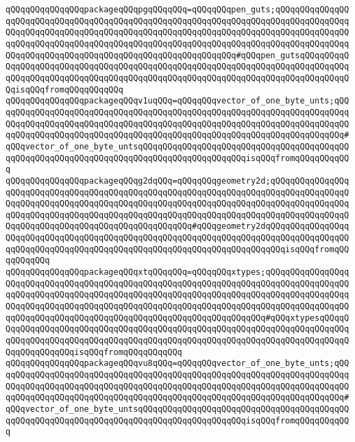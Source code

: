 \verb|qQQqqQQqqQQqqQQqpackageqQQqpgqQQqqQQq=qQQqqQQqpen_guts;qQQqqQQqqQQqqQQqqQQqqQQqqQQqqQQqqQQqqQQqqQQqqQQqqQQqqQQqqQQqqQQqqQQqqQQqqQQqqQQqqQQqqQQqqQQqqQQqqQQqqQQqqQQqqQQqqQQqqQQqqQQqqQQqqQQqqQQqqQQqqQQqqQQqqQQqqQQqqQQqqQQqqQQqqQQqqQQqqQQqqQQqqQQqqQQqqQQqqQQqqQQqqQQqqQQqqQQqqQQqqQQqqQQqqQQqqQQqqQQqqQQqqQQqqQQqqQQqqQQqqQQqqQQqqQQq#qQQqpen_gutsqQQqqQQqqQQqqQQqqQQqqQQqqQQqqQQqqQQqqQQqqQQqqQQqqQQqqQQqqQQqqQQqqQQqqQQqqQQqqQQqqQQqqQQqqQQqqQQqqQQqqQQqqQQqqQQqqQQqqQQqqQQqqQQqqQQqqQQqqQQqqQQqqQQqqQQqisqQQqfromqQQqqQQqqQQq|\newline
\verb|qQQqqQQqqQQqqQQqpackageqQQqv1uqQQq=qQQqqQQqvector_of_one_byte_unts;qQQqqQQqqQQqqQQqqQQqqQQqqQQqqQQqqQQqqQQqqQQqqQQqqQQqqQQqqQQqqQQqqQQqqQQqqQQqqQQqqQQqqQQqqQQqqQQqqQQqqQQqqQQqqQQqqQQqqQQqqQQqqQQqqQQqqQQqqQQqqQQqqQQqqQQqqQQqqQQqqQQqqQQqqQQqqQQqqQQqqQQqqQQqqQQqqQQqqQQqqQQqqQQqqQQq#qQQqvector_of_one_byte_untsqQQqqQQqqQQqqQQqqQQqqQQqqQQqqQQqqQQqqQQqqQQqqQQqqQQqqQQqqQQqqQQqqQQqqQQqqQQqqQQqqQQqqQQqqQQqisqQQqfromqQQqqQQqqQQq|\newline
\verb|qQQqqQQqqQQqqQQqpackageqQQqg2dqQQq=qQQqqQQqgeometry2d;qQQqqQQqqQQqqQQqqQQqqQQqqQQqqQQqqQQqqQQqqQQqqQQqqQQqqQQqqQQqqQQqqQQqqQQqqQQqqQQqqQQqqQQqqQQqqQQqqQQqqQQqqQQqqQQqqQQqqQQqqQQqqQQqqQQqqQQqqQQqqQQqqQQqqQQqqQQqqQQqqQQqqQQqqQQqqQQqqQQqqQQqqQQqqQQqqQQqqQQqqQQqqQQqqQQqqQQqqQQqqQQqqQQqqQQqqQQqqQQqqQQqqQQqqQQqqQQqqQQqqQQq#qQQqgeometry2dqQQqqQQqqQQqqQQqqQQqqQQqqQQqqQQqqQQqqQQqqQQqqQQqqQQqqQQqqQQqqQQqqQQqqQQqqQQqqQQqqQQqqQQqqQQqqQQqqQQqqQQqqQQqqQQqqQQqqQQqqQQqqQQqqQQqqQQqqQQqqQQqisqQQqfromqQQqqQQqqQQq|\newline
\verb|qQQqqQQqqQQqqQQqpackageqQQqxtqQQqqQQq=qQQqqQQqxtypes;qQQqqQQqqQQqqQQqqQQqqQQqqQQqqQQqqQQqqQQqqQQqqQQqqQQqqQQqqQQqqQQqqQQqqQQqqQQqqQQqqQQqqQQqqQQqqQQqqQQqqQQqqQQqqQQqqQQqqQQqqQQqqQQqqQQqqQQqqQQqqQQqqQQqqQQqqQQqqQQqqQQqqQQqqQQqqQQqqQQqqQQqqQQqqQQqqQQqqQQqqQQqqQQqqQQqqQQqqQQqqQQqqQQqqQQqqQQqqQQqqQQqqQQqqQQqqQQqqQQqqQQqqQQqqQQqqQQqqQQq#qQQqxtypesqQQqqQQqqQQqqQQqqQQqqQQqqQQqqQQqqQQqqQQqqQQqqQQqqQQqqQQqqQQqqQQqqQQqqQQqqQQqqQQqqQQqqQQqqQQqqQQqqQQqqQQqqQQqqQQqqQQqqQQqqQQqqQQqqQQqqQQqqQQqqQQqqQQqqQQqqQQqqQQqisqQQqfromqQQqqQQqqQQq|\newline
\verb|qQQqqQQqqQQqqQQqpackageqQQqvu8qQQq=qQQqqQQqvector_of_one_byte_unts;qQQqqQQqqQQqqQQqqQQqqQQqqQQqqQQqqQQqqQQqqQQqqQQqqQQqqQQqqQQqqQQqqQQqqQQqqQQqqQQqqQQqqQQqqQQqqQQqqQQqqQQqqQQqqQQqqQQqqQQqqQQqqQQqqQQqqQQqqQQqqQQqqQQqqQQqqQQqqQQqqQQqqQQqqQQqqQQqqQQqqQQqqQQqqQQqqQQqqQQqqQQqqQQqqQQq#qQQqvector_of_one_byte_untsqQQqqQQqqQQqqQQqqQQqqQQqqQQqqQQqqQQqqQQqqQQqqQQqqQQqqQQqqQQqqQQqqQQqqQQqqQQqqQQqqQQqqQQqqQQqisqQQqfromqQQqqQQqqQQq|\newline
